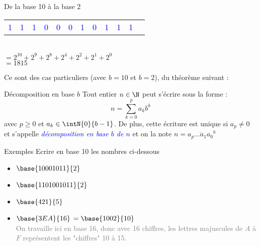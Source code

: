 \documentclass[10pt]{beamer}
\begin{document}
\begin{frame}{\Ctitle}{\stitle}
\begin{block}{De la base 10 à la base 2}
\begin{itemize}
\begin{tabular}{p{0.4cm}|p{0.4cm}|p{0.4cm}|p{0.4cm}|p{0.4cm}|p{0.4cm}|p{0.4cm}|p{0.4cm}|p{0.4cm}|p{0.4cm}|p{0.4cm}c}
				\hline
                \textcolor{blue}{1} & \textcolor{blue}{1} & \textcolor{blue}{1} & \textcolor{blue}{0} & \textcolor{blue}{0} & \textcolor{blue}{0} & \textcolor{blue}{1} & \textcolor{blue}{0}  & \textcolor{blue}{1}& \textcolor{blue}{1}& \textcolor{blue}{1} \\
			\end{tabular}
             \\ \textcolor{BrickRed}{$\scriptstyle{= 2^{10} + 2^9 + 2^8 + 2^4 + 2^2 + 2^1 + 2^0}$}
             \\ \textcolor{BrickRed}{$\scriptstyle{= 1815}$}
    \end{itemize}
	\end{block}
\end{frame}

\begin{frame}{\Ctitle}{\stitle}
    Ce sont des cas particuliers (avec $b=10$ et $b=2$), du théorème suivant  :
	\begin{alertblock}{Décomposition en base $b$}
		Tout entier $n \in \N$ peut s'écrire sous la forme :
        $$ n = \sum_{k=0}^{p} a_k b^k$$
        avec $p \geq 0$ et $a_k \in \intN{0}{b-1}$. De plus, cette écriture est unique si $a_p \neq 0$ et s'appelle \textcolor{blue}{\textit{décomposition en base $b$ de $n$}} et on la note $n = \overline{a_p\dots a_1 a_0}^b$
	\end{alertblock}
\end{frame}


\begin{frame}{\Ctitle}{\stitle}
	\begin{exampleblock}{Exemples}
        Ecrire en base 10 les nombres ci-dessous
        \begin{itemize}
            \item<1-> $\base{10001011}{2}$ 
            \item <2-> $\base{1101001011}{2}$ 
            \item<3-> $\base{421}{5}$
            \item<4-> $\base{3EA}{16}$ 
             {\textcolor{OliveGreen}{$=\base{1002}{10}$}}\\
            \textcolor{gray}{\small On travaille ici en base 16, donc avec 16 chiffres, les lettres majuscules de $A$ à $F$ représentent les "chiffres" 10 à 15.}  \\
        \end{itemize}
    \end{exampleblock}
\end{frame}
\end{document}

